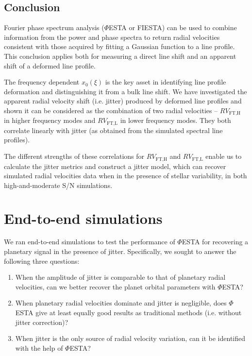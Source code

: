 \subsection{Conclusion}

Fourier phase spectrum analysis ($\mathit{\Phi}$ESTA or FIESTA) can be used to combine information from the power and phase spectra to return radial velocities consistent with those acquired by fitting a Gaussian function to a line profile. This conclusion applies both for measuring a direct line shift and an apparent shift of a deformed line profile. 

The frequency dependent $x_0(\xi)$ is the key asset in identifying line profile deformation and distinguishing it from a bulk line shift. We have investigated the apparent radial velocity shift (i.e. jitter) produced by deformed line profiles and shown it can be considered as the combination of two radial velocities -- $RV_\text{FT,H}$ in higher frequency modes and $RV_\text{FT,L}$ in lower frequency modes. They both correlate linearly with jitter (as obtained from the simulated spectral line profiles). 

The different strengths of these correlations for $RV_\text{FT,H}$ and $RV_\text{FT,L}$ enable us to calculate the jitter metrics and construct a jitter model, which can recover simulated radial velocities data when in the presence of stellar variability, in both high-and-moderate S/N simulations. 

\pagebreak
\section{End-to-end simulations}
\label{\thesection}
\label{sec:end-to-end}

We ran end-to-end simulations to test the performance of $\mathit{\Phi}$ESTA for recovering a planetary signal in the presence of jitter. Specifically, we sought to answer the following three questions:
\begin{enumerate}
	\item When the amplitude of jitter is comparable to that of planetary radial velocities, can we better recover the planet orbital parameters with $\mathit{\Phi}$ESTA? 
	\item When planetary radial velocities dominate and jitter is negligible, does $\mathit{\Phi}$ESTA give at least equally good results as traditional methods (i.e. without jitter correction)? 
	\item When jitter is the only source of radial velocity variation, can it be identified with the help of $\mathit{\Phi}$ESTA?
\end{enumerate}

